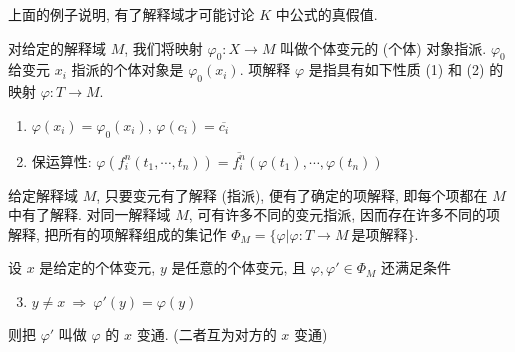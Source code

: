 \documentclass[
    mode=hazy,
    color=blue,
    device=normal,
    lang=cn
]{elegantnote}
\begin{document}
上面的例子说明, 有了解释域才可能讨论 $K$ 中公式的真假值.
\begin{definition}[项解释]
    对给定的解释域 $M$, 我们将映射 $\varphi_0: X\to M$ 叫做个体变元的 (个体) 对象指派. $\varphi_0$ 给变元 $x_i$ 指派的个体对象是 $\varphi_0(x_i)$. 项解释 $\varphi$ 是指具有如下性质 (1) 和 (2) 的映射 $\varphi: T\to M$.
    \begin{enumerate}[(1)]
        \item $\varphi(x_i)=\varphi_0(x_i)$, $\varphi(c_i)=\overline{c_i}$
        \item 保运算性: $\varphi(f_i^n(t_1, \cdots, t_n))=\overline{f_i^n}(\varphi(t_1), \cdots, \varphi(t_n))$
    \end{enumerate}
\end{definition}
给定解释域 $M$, 只要变元有了解释 (指派), 便有了确定的项解释, 即每个项都在 $M$ 中有了解释. 对同一解释域 $M$, 可有许多不同的变元指派, 因而存在许多不同的项解释, 把所有的项解释组成的集记作 $\Phi_M = \{\varphi\vert\varphi:T\to M\ \text{是项解释}\}$.
\begin{definition}[项解释的变元变通]
    设 $x$ 是给定的个体变元, $y$ 是任意的个体变元, 且 $\varphi, \varphi'\in\Phi_M$ 还满足条件
    \begin{enumerate}[(1)]\setcounter{enumi}{2}
        \item $y\neq x\ \Rightarrow\  \varphi'(y)=\varphi(y)$
    \end{enumerate} 
    则把 $\varphi'$ 叫做 $\varphi$ 的 $x$ 变通. (二者互为对方的 $x$ 变通)
\end{definition}
\end{document}
